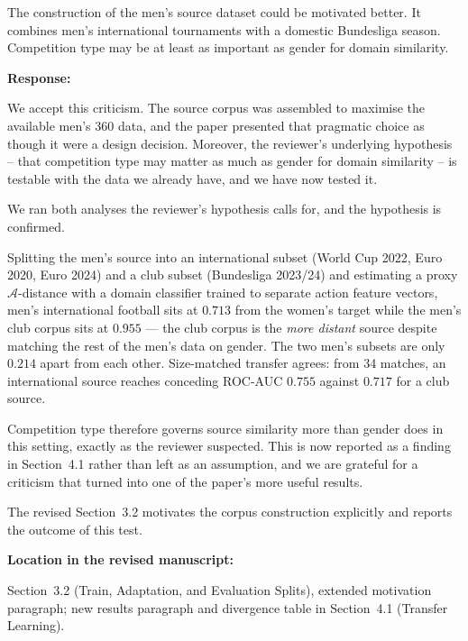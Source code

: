 \documentclass[11pt,a4paper]{article}
\newcommand{\pending}[1]{\textcolor{statuspending}{#1}}
\newcommand{\response}[2]{%
  \begin{responsebox}
  \textbf{Response:}

  #1
  \end{responsebox}
  \begin{locationbox}
  \textbf{Location in the revised manuscript:}

  #2
  \end{locationbox}
}
\begin{document}
\begin{reviewbox}[Comment 6]
The construction of the men's source dataset could be motivated better. It combines men's international tournaments with a domestic Bundesliga season. Competition type may be at least as important as gender for domain similarity.
\end{reviewbox}
\response{We accept this criticism. The source corpus was assembled to maximise the available men's 360 data, and the paper presented that pragmatic choice as though it were a design decision. Moreover, the reviewer's underlying hypothesis -- that competition type may matter as much as gender for domain similarity -- is testable with the data we already have, and we have now tested it.

We ran both analyses the reviewer's hypothesis calls for, and the hypothesis is confirmed.

Splitting the men's source into an international subset (World Cup 2022, Euro 2020, Euro 2024) and a club subset (Bundesliga 2023/24) and estimating a proxy $\mathcal{A}$-distance with a domain classifier trained to separate action feature vectors, men's international football sits at $0.713$ from the women's target while the men's club corpus sits at $0.955$ --- the club corpus is the \emph{more distant} source despite matching the rest of the men's data on gender. The two men's subsets are only $0.214$ apart from each other. Size-matched transfer agrees: from 34 matches, an international source reaches conceding ROC-AUC $0.755$ against $0.717$ for a club source.

Competition type therefore governs source similarity more than gender does in this setting, exactly as the reviewer suspected. This is now reported as a finding in Section~4.1 rather than left as an assumption, and we are grateful for a criticism that turned into one of the paper's more useful results.

\pending{The revised Section~3.2 motivates the corpus construction explicitly and reports the outcome of this test.}}{Section~3.2 (Train, Adaptation, and Evaluation Splits), extended motivation paragraph; new results paragraph and divergence table in Section~4.1 (Transfer Learning).}
\end{document}
